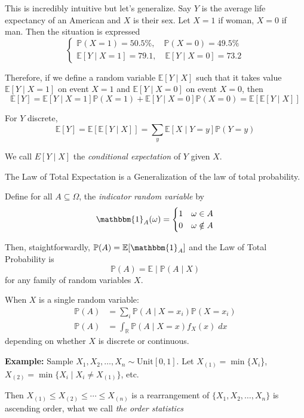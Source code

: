 \documentclass[12pt]{article}
\renewcommand{\P}{\mathbb{P}}
\newcommand{\R}{\mathbb{R}}
\newcommand{\E}{\mathbb{E}}
\newcommand{\ind}{\mathbbm{1}}
\newcommand{\sub}{\subseteq}
\begin{document}
    This is incredibly intuitive but let's generalize. Say $Y$ is the average life expectancy of an American and $X$ is their sex. Let $X = 1$ if woman, $X =0$ if man. 
    Then the situation is expressed 
    \[\begin{cases}
        \P(X = 1) = 50.5\%, \quad \P(X = 0) = 49.5\%\\ 
        \E[Y \; | \; X = 1] = 79.1, \quad \E[Y \; | \; X = 0] = 73.2
    \end{cases}\]  


    Therefore, if we define a random variable $\E[Y \; | \; X]$ such that it takes value $\E[Y \; | \; X = 1]$ on event $X = 1$ and $\E[Y \; | \; X = 0]$ on event $X = 0$, then
    \[\E[Y] = \E[Y \; | \; X=1] \P(X = 1) + \E[Y \; | \; X = 0] \P(X = 0) = \E[\E[Y \; | \; X]]\]
    
    For $Y$ discrete, 
    \[\E[Y] = \E[\E[Y \; | \; X]] = \sum_y \E[X \; | \; Y = y] \P(Y = y)\]

    We call $E[Y \; | \; X]$ the \emph{conditional expectation} of $Y$ given $X$. 

    The Law of Total Expectation is a Generalization of the law of total probability. 

    Define for all $A \sub \Omega$, the \emph{indicator random variable} by
    \[\ind_{A}(\omega) = \begin{cases}
        1 & \omega \in A\\
        0 & \omega \notin A
    \end{cases}\]  

    Then, staightforwardly, $\P(A) = \E[\ind_A]$ and the Law of Total Probability is 
    \[\P(A) = \E \; | \; \P(A \; | \; X)\] 
    for any family of random variables $X$. 
    
    When $X$ is a single random variable: 
    \begin{align*}
        \P(A) &= \sum_i \P(A \; | \; X = x_i) \P(X = x_i)\\ 
        \P(A) &= \int_{\R} \P(A \; | \; X= x) f_X(x)\; dx
    \end{align*}
    depending on whether $X$ is discrete or continuous.

    \textbf{Example:} Sample $X_1, X_2, \dots, X_n \sim \text{Unit}[0, 1]$. Let $X_{(1)} = \min \{X_i$\}, $X_{(2)} = \min\{X_i \; | \; X_i \neq X_{(1)}\}$, etc.

    Then $X_{(1)} \leq X_{(2)} \leq \cdots \leq X_{(n)}$ is a rearrangement of $\{X_1, X_2, \dots, X_n\}$ is ascending order, what we call \emph{the order statistics} 
\end{document}
